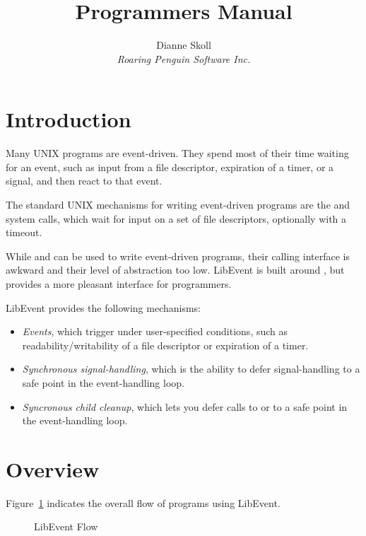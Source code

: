 \documentclass{article}
\title{\Le{} Programmers Manual}
\author{Dianne Skoll\\\textit{Roaring Penguin Software Inc.}}
\newcommand{\Le}{\textsf{LibEvent}}
\begin{document}
\maketitle

\section{Introduction}
\label{sec:introduction}

Many UNIX programs are event-driven.  They spend most of their time
waiting for an event, such as input from a file descriptor, expiration
of a timer, or a signal, and then react to that event.

The standard UNIX mechanisms for writing event-driven programs are
the  and  system calls, which wait for input
on a set of file descriptors, optionally with a timeout.

While  and  can be used to write event-driven
programs, their calling interface is awkward and their level of
abstraction too low.  \Le{} is built around , but
provides a more pleasant interface for programmers.

\Le{} provides the following mechanisms:
\begin{itemize}
\item \textit{Events}, which trigger under user-specified conditions,
  such as readability/writability of a file descriptor or expiration of
  a timer.
\item \textit{Synchronous signal-handling}, which is the ability to
  defer signal-handling to a safe point in the event-handling loop.
\item \textit{Syncronous child cleanup}, which lets you defer calls
  to  or  to a safe point in the event-handling
  loop.
\end{itemize}

\section{Overview}
\label{sec:overview}

Figure~\ref{fig:flow} indicates the overall flow of programs using
\Le{}.
\begin{figure}[htbp]
  \begin{center}
    \caption{\Le{} Flow}
    \label{fig:flow}
  \end{center}
\end{figure}
\end{document}
